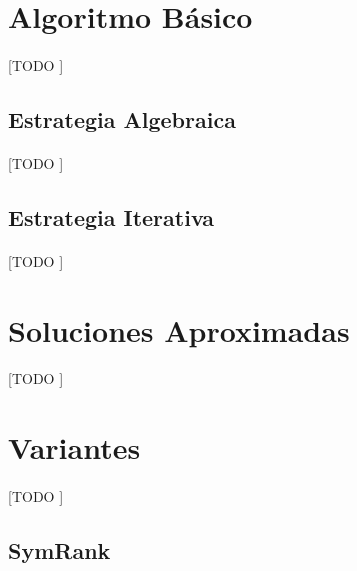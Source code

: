 \documentclass{subfiles}
\begin{document}
    \section{Algoritmo Básico}
    \label{sec:pagerank_algorithm}

      \paragraph{}
      [TODO ]

      \subsection{Estrategia Algebraica}
      \label{sec:pagerank_algorithm_algebraic}

        \paragraph{}
        [TODO ]

      \subsection{Estrategia Iterativa}
      \label{sec:pagerank_algorithm_iterative}

        \paragraph{}
        [TODO ]

    \section{Soluciones Aproximadas}
    \label{sec:pagerank_algorithm_approximated}

      \paragraph{}
      [TODO ]

      \section{Variantes}
      \label{sec:pagerank_variants}

        \paragraph{}
        [TODO ]

        \subsection{SymRank}
        \label{sec:symrank}
\end{document}
